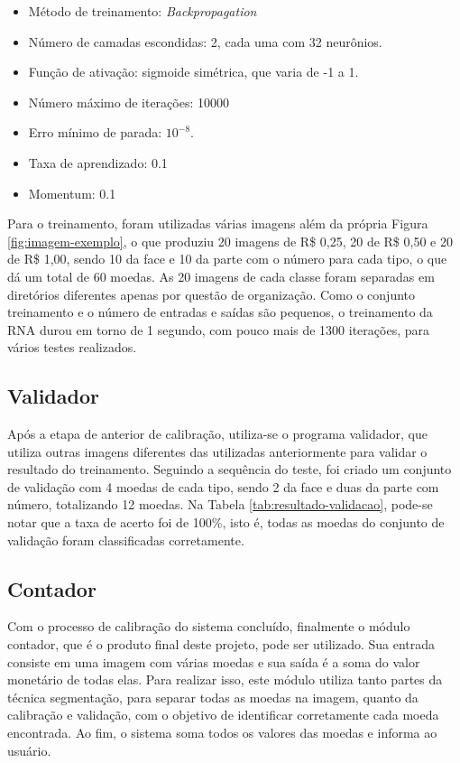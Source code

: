 \documentclass[10pt,journal,compsoc]{IEEEtran}
\begin{document}
\begin{itemize}  
\item Método de treinamento: \textit{Backpropagation}
\item Número de camadas escondidas: 2, cada uma com 32 neurônios.
\item Função de ativação: sigmoide simétrica, que varia de -1 a 1.
\item Número máximo de iterações: 10000
\item Erro mínimo de parada:  $10 ^ {-8}$.
\item Taxa de aprendizado: 0.1
\item Momentum: 0.1
\end{itemize}

Para o treinamento, foram utilizadas várias imagens além da própria Figura \ref{fig:imagem-exemplo}, o que produziu  20 imagens de R\$ 0,25, 20 de R\$ 0,50 e 20 de R\$ 1,00, sendo 10 da face e 10 da parte com o número para cada tipo, o que dá um total de 60 moedas. As 20 imagens de cada classe foram separadas em diretórios diferentes apenas por questão de organização. Como o conjunto treinamento e o número de entradas e saídas são pequenos, o treinamento da RNA durou em torno de 1 segundo, com pouco mais de 1300 iterações, para vários testes realizados.

\subsection{Validador}
\label{sec:validador}

Após a etapa de anterior de calibração, utiliza-se o programa validador, que utiliza outras imagens diferentes das utilizadas anteriormente para validar o resultado do treinamento. Seguindo a sequência do teste, foi criado um conjunto de validação com 4 moedas de cada tipo, sendo 2 da face e duas da parte com número, totalizando 12 moedas. Na Tabela \ref{tab:resultado-validacao}, pode-se notar que a taxa de acerto foi de 100\%, isto é, todas as moedas do conjunto de validação foram classificadas corretamente.

\subsection{Contador}
\label{sec:contador}

Com o processo de calibração do sistema concluído, finalmente o módulo contador, que é o produto final deste projeto, pode ser utilizado. Sua entrada consiste em uma imagem com várias moedas e sua saída é a soma do valor monetário de todas elas. Para realizar isso, este módulo utiliza tanto partes da técnica segmentação, para separar todas as moedas na imagem, quanto da calibração e validação, com o objetivo de identificar corretamente cada moeda encontrada. Ao fim, o sistema soma todos os valores das moedas e informa ao usuário.
\end{document}

